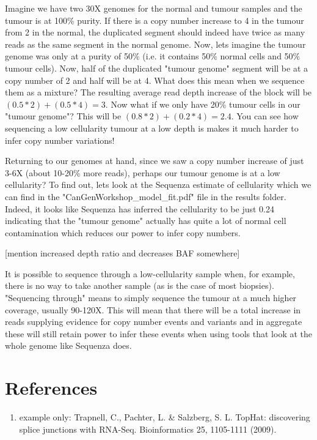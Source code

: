 Imagine we have two 30X genomes for the normal and tumour samples and the tumour is at 100\% purity. If there is a copy number increase to 4 in the tumour from 2 in the normal, the duplicated segment should indeed have twice as many reads as the same segment in the normal genome. Now, lets imagine the tumour genome was only at a purity of 50\% (i.e. it contains 50\% normal cells and 50\% tumour cells). Now, half of the duplicated "tumour genome" segment will be at a copy number of 2 and half will be at 4. What does this mean when we sequence them as a mixture? The resulting average read depth increase of the block will be $(0.5*2)+(0.5*4) = 3$. Now what if we only have 20\% tumour cells in our "tumour genome"? This will be $(0.8*2)+(0.2*4) = 2.4$. You can see how sequencing a low cellularity tumour at a low depth is makes it much harder to infer copy number variations!

Returning to our genomes at hand, since we saw a copy number increase of just 3-6X (about 10-20\% more reads), perhaps our tumour genome is at a low cellularity? To find out, lets look at the Sequenza estimate of cellularity which we can find in the "CanGenWorkshop_model_fit.pdf" file in the results folder. Indeed, it looks like Sequenza has inferred the cellularity to be just 0.24 indicating that the "tumour genome" actually has quite a lot of normal cell contamination which reduces our power to infer copy numbers.

[mention increased depth ratio and decreases BAF somewhere]

\begin{note}
It is possible to sequence through a low-cellularity sample when, for example, there is no way to take another sample (as is the case of most biopsies). "Sequencing through" means to simply sequence the tumour at a much higher coverage, usually 90-120X. This will mean that there will be a total increase in reads supplying evidence for copy number events and variants and in aggregate these will still retain power to infer these events when using tools that look at the whole genome like Sequenza does.
\end{note}


\newpage


\section{References}

\begin{enumerate}
  \item example only: Trapnell, C., Pachter, L. \& Salzberg, S. L. TopHat: discovering splice
  junctions with RNA-Seq. Bioinformatics 25, 1105-1111 (2009).
  
\end{enumerate}
